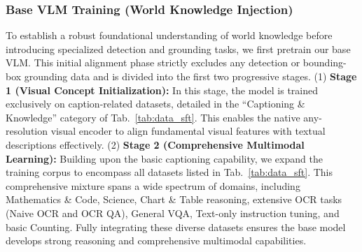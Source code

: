 \documentclass{llmxive}
\begin{document}
\subsubsection{Base VLM Training (World Knowledge Injection)}
To establish a robust foundational understanding of world knowledge before introducing specialized detection and grounding tasks, we first pretrain our base VLM. This initial alignment phase strictly excludes any detection or bounding-box grounding data and is divided into the first two progressive stages. (1) \textbf{Stage 1 (Visual Concept Initialization):} In this stage, the model is trained exclusively on caption-related datasets, detailed in the ``Captioning \& Knowledge'' category of Tab.~\ref{tab:data_sft}. This enables the native any-resolution visual encoder to align fundamental visual features with textual descriptions effectively. (2) \textbf{Stage 2 (Comprehensive Multimodal Learning):} Building upon the basic captioning capability, we expand the training corpus to encompass all datasets listed in Tab.~\ref{tab:data_sft}. This comprehensive mixture spans a wide spectrum of domains, including Mathematics \& Code, Science, Chart \& Table reasoning, extensive OCR tasks (Naive OCR and OCR QA), General VQA, Text-only instruction tuning, and basic Counting. Fully integrating these diverse datasets ensures the base model develops strong reasoning and comprehensive multimodal capabilities.
\end{document}
